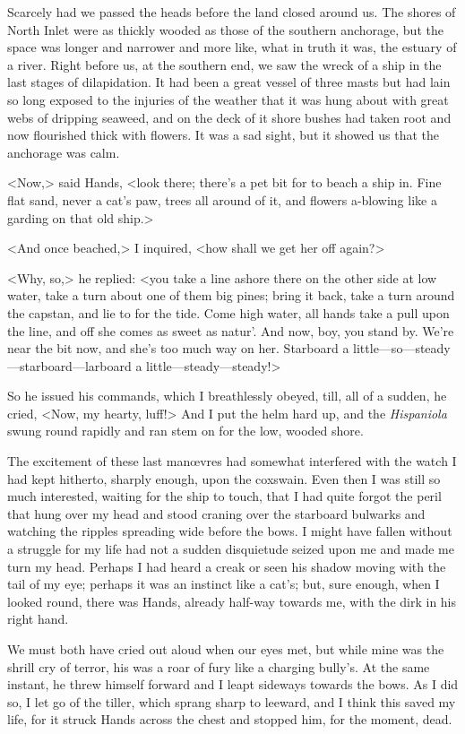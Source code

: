 Scarcely had we passed the heads before the land closed around us. The shores of North Inlet were as thickly wooded as those of the southern anchorage, but the space was longer and narrower and more like, what in truth it was, the estuary of a river. Right before us, at the southern end, we saw the wreck of a ship in the last stages of dilapidation. It had been a great vessel of three masts but had lain so long exposed to the injuries of the weather that it was hung about with great webs of dripping seaweed, and on the deck of it shore bushes had taken root and now flourished thick with flowers. It was a sad sight, but it showed us that the anchorage was calm.

<Now,> said Hands, <look there; there's a pet bit for to beach a ship in. Fine flat sand, never a cat's paw, trees all around of it, and flowers a-blowing like a garding on that old ship.>

<And once beached,> I inquired, <how shall we get her off again?>

<Why, so,> he replied: <you take a line ashore there on the other side at low water, take a turn about one of them big pines; bring it back, take a turn around the capstan, and lie to for the tide. Come high water, all hands take a pull upon the line, and off she comes as sweet as natur'. And now, boy, you stand by. We're near the bit now, and she's too much way on her. Starboard a little—so—steady—starboard—larboard a little—steady—steady!>

So he issued his commands, which I breathlessly obeyed, till, all of a sudden, he cried, <Now, my hearty, luff!> And I put the helm hard up, and the \textit{Hispaniola} swung round rapidly and ran stem on for the low, wooded shore.

The excitement of these last manœvres had somewhat interfered with the watch I had kept hitherto, sharply enough, upon the coxswain. Even then I was still so much interested, waiting for the ship to touch, that I had quite forgot the peril that hung over my head and stood craning over the starboard bulwarks and watching the ripples spreading wide before the bows. I might have fallen without a struggle for my life had not a sudden disquietude seized upon me and made me turn my head. Perhaps I had heard a creak or seen his shadow moving with the tail of my eye; perhaps it was an instinct like a cat's; but, sure enough, when I looked round, there was Hands, already half-way towards me, with the dirk in his right hand.

We must both have cried out aloud when our eyes met, but while mine was the shrill cry of terror, his was a roar of fury like a charging bully's. At the same instant, he threw himself forward and I leapt sideways towards the bows. As I did so, I let go of the tiller, which sprang sharp to leeward, and I think this saved my life, for it struck Hands across the chest and stopped him, for the moment, dead.

